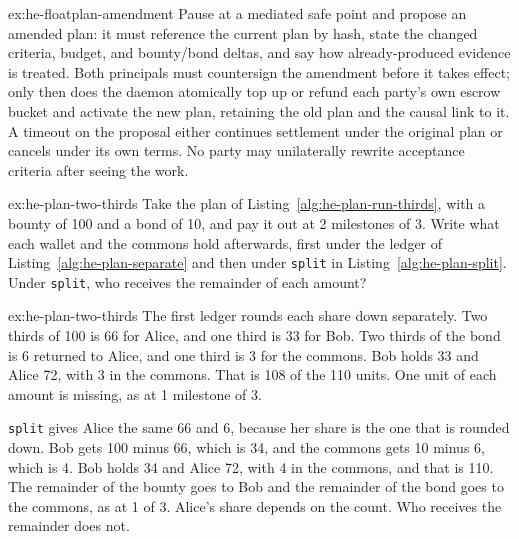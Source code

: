 \documentclass[11pt,a4paper]{article}
\theoremstyle{definition}
\theoremstyle{definition}
\theoremstyle{remark}
\begin{document}
\begin{pdsolution}{ex:he-floatplan-amendment}
Pause at a mediated safe point and propose an amended plan: it must
reference the current plan by hash, state the changed criteria, budget, and bounty/bond
deltas, and say how already-produced evidence is treated. Both principals must
countersign the amendment before it takes effect; only then does the daemon atomically
top up or refund each party's own escrow bucket and activate the new plan,
retaining the old plan and the causal link to it. A timeout on the proposal either
continues settlement under the original plan or cancels under its own terms.
No party may unilaterally rewrite acceptance criteria after seeing
the work.
\end{pdsolution}


\begin{pdexercise}[kind=Trace,rating=1]{ex:he-plan-two-thirds}
Take the plan of Listing~\ref{alg:he-plan-run-thirds}, with a bounty of 100 and a bond of 10, and pay it out at 2 milestones of 3. Write what each wallet and the commons hold afterwards, first under the ledger of Listing~\ref{alg:he-plan-separate} and then under \texttt{split} in Listing~\ref{alg:he-plan-split}. Under \texttt{split}, who receives the remainder of each amount?
\end{pdexercise}
\begin{pdsolution}{ex:he-plan-two-thirds}
The first ledger rounds each share down separately. Two thirds of 100 is 66 for Alice, and one third is 33 for Bob. Two thirds of the bond is 6 returned to Alice, and one third is 3 for the commons. Bob holds 33 and Alice 72, with 3 in the commons. That is 108 of the 110 units. One unit of each amount is missing, as at 1 milestone of 3.

\texttt{split} gives Alice the same 66 and 6, because her share is the one that is rounded down. Bob gets 100 minus 66, which is 34, and the commons gets 10 minus 6, which is 4. Bob holds 34 and Alice 72, with 4 in the commons, and that is 110. The remainder of the bounty goes to Bob and the remainder of the bond goes to the commons, as at 1 of 3. Alice's share depends on the count. Who receives the remainder does not.
\end{pdsolution}
\end{document}
